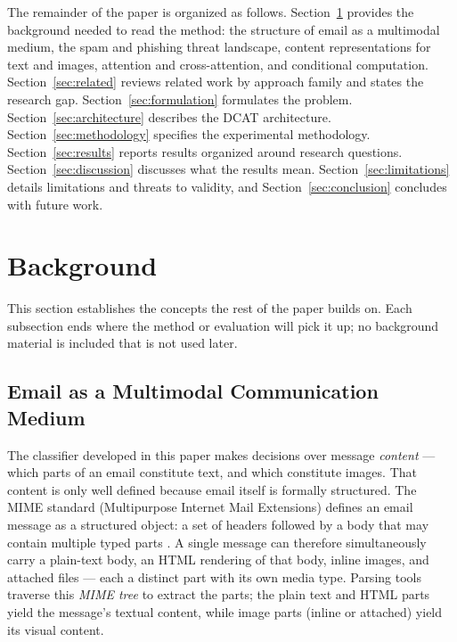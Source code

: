 \documentclass[10pt,twoside]{article}
\begin{document}
The remainder of the paper is organized as follows. Section~\ref{sec:background} provides the background needed to read the method: the structure of email as a multimodal medium, the spam and phishing threat landscape, content representations for text and images, attention and cross-attention, and conditional computation. Section~\ref{sec:related} reviews related work by approach family and states the research gap. Section~\ref{sec:formulation} formulates the problem. Section~\ref{sec:architecture} describes the DCAT architecture. Section~\ref{sec:methodology} specifies the experimental methodology. Section~\ref{sec:results} reports results organized around research questions. Section~\ref{sec:discussion} discusses what the results mean. Section~\ref{sec:limitations} details limitations and threats to validity, and Section~\ref{sec:conclusion} concludes with future work.

\section{Background}\label{sec:background}

This section establishes the concepts the rest of the paper builds on. Each subsection ends where the method or evaluation will pick it up; no background material is included that is not used later.

\subsection{Email as a Multimodal Communication Medium}\label{sec:bg-mime}

The classifier developed in this paper makes decisions over message \emph{content} --- which parts of an email constitute text, and which constitute images. That content is only well defined because email itself is formally structured. The MIME standard (Multipurpose Internet Mail Extensions) defines an email message as a structured object: a set of headers followed by a body that may contain multiple typed parts \citep{rfc2045}. A single message can therefore simultaneously carry a plain-text body, an HTML rendering of that body, inline images, and attached files --- each a distinct part with its own media type. Parsing tools traverse this \emph{MIME tree} to extract the parts; the plain text and HTML parts yield the message's textual content, while image parts (inline or attached) yield its visual content.
\end{document}
